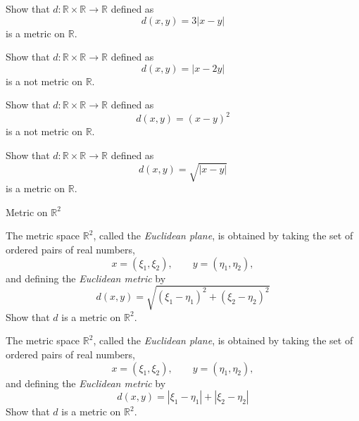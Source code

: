 \documentclass[12pt, a4paper]{article}
\begin{document}
\clearpage

\begin{theorem}
    Show that $d:\mathbb{R}\times\mathbb{R}\to\mathbb{R}$ defined as
    \[
        d(x,y)=3|x-y|
    \]
    is a metric on $\mathbb{R}$.
\end{theorem}

\clearpage

\begin{problem}
    Show that $d:\mathbb{R}\times\mathbb{R}\to\mathbb{R}$ defined as
    \[
        d(x,y)=|x-2y|
    \]
    is a not metric on $\mathbb{R}$.
\end{problem}

\clearpage

\begin{problem}
    Show that $d:\mathbb{R}\times\mathbb{R}\to\mathbb{R}$ defined as
    \[
        d(x,y)=(x-y)^2
    \]
    is a not metric on $\mathbb{R}$.
\end{problem}

\clearpage

\begin{theorem}
    Show that $d:\mathbb{R}\times\mathbb{R}\to\mathbb{R}$ defined as
    \[
        d(x,y)=\sqrt{|x-y|}
    \]
    is a metric on $\mathbb{R}$.
\end{theorem}

\clearpage

\begin{heading}
    Metric on $\mathbb{R}^2$
\end{heading}

\vspace{10pt}

\begin{theorem}
    The metric space $\mathbb{R}^2$, called the \emph{Euclidean plane}, is obtained by
    taking the set of ordered pairs of real numbers,
    \[
    x=(\xi_1,\xi_2), \qquad y=(\eta_1,\eta_2),
    \]
    and defining the \emph{Euclidean metric} by
    \[
    d(x,y)=\sqrt{(\xi_1-\eta_1)^2+(\xi_2-\eta_2)^2}
    \]
    Show that $d$ is a metric on $\mathbb{R}^2$.
\end{theorem}

\clearpage

\begin{theorem}
    The metric space $\mathbb{R}^2$, called the \emph{Euclidean plane}, is obtained by
    taking the set of ordered pairs of real numbers,
    \[
    x=(\xi_1,\xi_2), \qquad y=(\eta_1,\eta_2),
    \]
    and defining the \emph{Euclidean metric} by
    \[
    d(x,y)=|\xi_1-\eta_1|+|\xi_2-\eta_2|
    \]
    Show that $d$ is a metric on $\mathbb{R}^2$.
\end{theorem}
\end{document}
